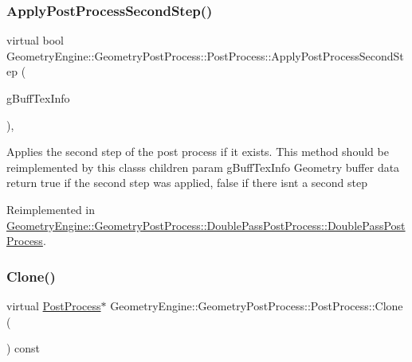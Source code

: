 \subsubsection{\texorpdfstring{ApplyPostProcessSecondStep()}{ApplyPostProcessSecondStep()}}
{\footnotesize\ttfamily virtual bool Geometry\+Engine\+::\+Geometry\+Post\+Process\+::\+Post\+Process\+::\+Apply\+Post\+Process\+Second\+Step (\begin{DoxyParamCaption}\item[{const \mbox{\hyperlink{struct_geometry_engine_1_1_g_buffer_texture_info}{G\+Buffer\+Texture\+Info}} \&}]{g\+Buff\+Tex\+Info }\end{DoxyParamCaption})\hspace{0.3cm}{\ttfamily [inline]}, {\ttfamily [virtual]}}

Applies the second step of the post process if it exists. This method should be reimplemented by this class\textquotesingle{}s children param g\+Buff\+Tex\+Info Geometry buffer data return true if the second step was applied, false if there isn\textquotesingle{}t a second step 

Reimplemented in \mbox{\hyperlink{class_geometry_engine_1_1_geometry_post_process_1_1_double_pass_post_process_1_1_double_pass_post_process_a1caac8d2ec6f65de1bb98edd88ba14c6}{Geometry\+Engine\+::\+Geometry\+Post\+Process\+::\+Double\+Pass\+Post\+Process\+::\+Double\+Pass\+Post\+Process}}.

\mbox{\label{class_geometry_engine_1_1_geometry_post_process_1_1_post_process_aa80749cf09041335f6b3bda3aaf31711}} 
\subsubsection{\texorpdfstring{Clone()}{Clone()}}
{\footnotesize\ttfamily virtual \mbox{\hyperlink{class_geometry_engine_1_1_geometry_post_process_1_1_post_process}{Post\+Process}}$\ast$ Geometry\+Engine\+::\+Geometry\+Post\+Process\+::\+Post\+Process\+::\+Clone (\begin{DoxyParamCaption}{ }\end{DoxyParamCaption}) const\hspace{0.3cm}{\ttfamily [pure virtual]}}

